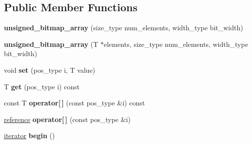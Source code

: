 \subsection*{Public Member Functions}
\begin{DoxyCompactItemize}
\item 
\mbox{\label{classdialog_1_1unsigned__bitmap__array_a4d694950b177597db7699e77267350f1}} 
{\bfseries unsigned\+\_\+bitmap\+\_\+array} (size\+\_\+type num\+\_\+elements, width\+\_\+type bit\+\_\+width)
\item 
\mbox{\label{classdialog_1_1unsigned__bitmap__array_ab02205927de3ee2a17539fc74f59b998}} 
{\bfseries unsigned\+\_\+bitmap\+\_\+array} (T $\ast$elements, size\+\_\+type num\+\_\+elements, width\+\_\+type bit\+\_\+width)
\item 
\mbox{\label{classdialog_1_1unsigned__bitmap__array_aa4419794d3574e0e09df023d0777ff96}} 
void {\bfseries set} (pos\+\_\+type i, T value)
\item 
\mbox{\label{classdialog_1_1unsigned__bitmap__array_a690643f7045025e155b96d310f8ed8f8}} 
T {\bfseries get} (pos\+\_\+type i) const
\item 
\mbox{\label{classdialog_1_1unsigned__bitmap__array_afdb24dce8a98cfbbf40eac935067b37c}} 
const T {\bfseries operator\mbox{[}$\,$\mbox{]}} (const pos\+\_\+type \&i) const
\item 
\mbox{\label{classdialog_1_1unsigned__bitmap__array_ab56f8c0ec937a8b2e5eeef98bcfca23d}} 
\hyperlink{classdialog_1_1value__reference}{reference} {\bfseries operator\mbox{[}$\,$\mbox{]}} (const pos\+\_\+type \&i)
\item 
\mbox{\label{classdialog_1_1unsigned__bitmap__array_a2caef77ec8403ea76166de6cdc3690e2}} 
\hyperlink{classdialog_1_1bitmap__array__iterator}{iterator} {\bfseries begin} ()
\item 
\mbox{\label{classdialog_1_1unsigned__bitmap__array_a738b81321c87e8d190ea401787f986d7}} 

\end{DoxyCompactItemize}
